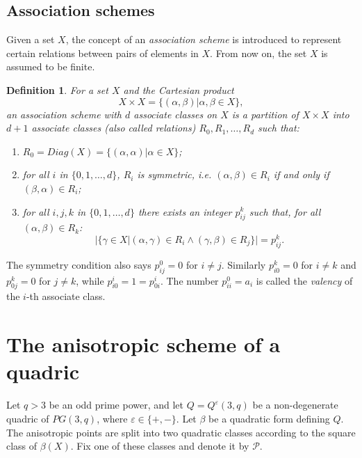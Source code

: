 \documentclass{article}
\theoremstyle{plain}
\newtheorem{defn}[thm]{Definition}
\begin{document}
\subsection{Association schemes}

Given a set $X$, the concept of an \textit{association scheme} is introduced to represent certain relations between pairs of elements in $X$. From now on, the set $X$ is assumed to be finite.
\begin{defn}
   For a set $X$ and the Cartesian product
   $$X\times X=\{(\alpha,\beta)|\alpha,\beta\in X\},$$
   an association scheme with $d$ associate classes on $X$ is a partition of $X\times X$ into $d+1$ associate classes (also called relations) $R_{0}, R_{1},\ldots, R_{d}$ such that:
   \begin{enumerate}
    \item $R_{0}=Diag(X)=\{(\alpha,\alpha)|\alpha\in X\}$;
    \item for all $i$ in $\{0,1,\ldots, d\}$, $R_{i}$ is symmetric, i.e. $(\alpha,\beta)\in R_{i}$ if and only if $(\beta,\alpha)\in R_{i}$;
    \item for all $i,j,k$ in $\{0,1,\ldots,d\}$ there exists an integer $p_{ij}^{k}$ such that, for all $(\alpha,\beta)\in R_{k}$:
         $$|\{\gamma\in X|(\alpha,\gamma)\in R_{i} \wedge (\gamma,\beta)\in R_{j}\}|=p_{ij}^{k}.$$
   \end{enumerate}
  \end{defn}
  The symmetry condition also says $p_{ij}^{0}=0$ for $i\neq j$. Similarly $p_{i0}^{k}=0$ for $i\neq k$ and $p_{0j}^{k}=0$ for $j\neq k$, while $p_{i0}^{i}=1=p_{0i}^{i}$. The number $p_{ii}^{0}=a_{i}$ is called the \textit{valency} of the $i$-th associate class.

\section{The anisotropic scheme of a quadric}

Let $q>3$ be an odd prime power, and let $Q=Q^\varepsilon(3,q)$ be a non-degenerate quadric of $PG(3,q)$, where $\varepsilon\in\{+,-\}$.  Let $\beta$ be a quadratic form defining
$Q$. The anisotropic points are split into two quadratic classes according to the square class of $\beta(X)$. Fix one of these classes and denote it by $\mathcal P$.
\end{document}
